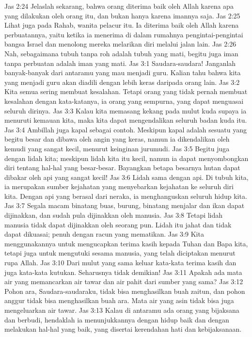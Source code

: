 Jas 2:24  Jelaslah sekarang, bahwa orang diterima baik oleh Allah karena apa yang dilakukan oleh orang itu, dan bukan hanya karena imannya saja.
Jas 2:25  Lihat juga pada Rahab, wanita pelacur itu. Ia diterima baik oleh Allah karena perbuatannya, yaitu ketika ia menerima di dalam rumahnya pengintai-pengintai bangsa Israel dan menolong mereka melarikan diri melalui jalan lain.
Jas 2:26  Nah, sebagaimana tubuh tanpa roh adalah tubuh yang mati, begitu juga iman tanpa perbuatan adalah iman yang mati.
Jas 3:1  Saudara-saudara! Janganlah banyak-banyak dari antaramu yang mau menjadi guru. Kalian tahu bahwa kita yang menjadi guru akan diadili dengan lebih keras daripada orang lain.
Jas 3:2  Kita semua sering membuat kesalahan. Tetapi orang yang tidak pernah membuat kesalahan dengan kata-katanya, ia orang yang sempurna, yang dapat menguasai seluruh dirinya.
Jas 3:3  Kalau kita memasang kekang pada mulut kuda supaya ia menuruti kemauan kita, maka kita dapat mengendalikan seluruh badan kuda itu.
Jas 3:4  Ambillah juga kapal sebagai contoh. Meskipun kapal adalah sesuatu yang begitu besar dan dibawa oleh angin yang keras, namun ia dikendalikan oleh kemudi yang sangat kecil, menurut keinginan jurumudi.
Jas 3:5  Begitu juga dengan lidah kita; meskipun lidah kita itu kecil, namun ia dapat menyombongkan diri tentang hal-hal yang besar-besar. Bayangkan betapa besarnya hutan dapat dibakar oleh api yang sangat kecil!
Jas 3:6  Lidah sama dengan api. Di tubuh kita, ia merupakan sumber kejahatan yang menyebarkan kejahatan ke seluruh diri kita. Dengan api yang berasal dari neraka, ia menghanguskan seluruh hidup kita.
Jas 3:7  Segala macam binatang buas, burung, binatang menjalar dan ikan dapat dijinakkan, dan sudah pula dijinakkan oleh manusia.
Jas 3:8  Tetapi lidah manusia tidak dapat dijinakkan oleh seorang pun. Lidah itu jahat dan tidak dapat dikuasai; penuh dengan racun yang mematikan.
Jas 3:9  Kita menggunakannya untuk mengucapkan terima kasih kepada Tuhan dan Bapa kita, tetapi juga untuk mengutuki sesama manusia, yang telah diciptakan menurut rupa Allah.
Jas 3:10  Dari mulut yang sama keluar kata-kata terima kasih dan juga kata-kata kutukan. Seharusnya tidak demikian!
Jas 3:11  Apakah ada mata air yang memancarkan air tawar dan air pahit dari sumber yang sama?
Jas 3:12  Pohon ara, Saudara-saudaraku, tidak bisa menghasilkan buah zaitun, dan pohon anggur tidak bisa menghasilkan buah ara. Mata air yang asin tidak bisa juga mengeluarkan air tawar.
Jas 3:13  Kalau di antaramu ada orang yang bijaksana dan berbudi, hendaklah ia menunjukkannya dengan hidup baik dan dengan melakukan hal-hal yang baik, yang disertai kerendahan hati dan kebijaksanaan.
